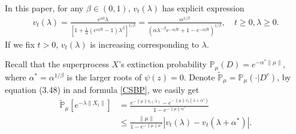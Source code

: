\documentclass[12pt,oneside,english]{amsart}
\theoremstyle{plain}
\theoremstyle{definition}
\numberwithin{equation}{section}
\begin{document}
In this paper, for any $\beta\in (0,1)$, $v_t(\lambda)$ has explicit expression \cite[Example 3.1]{Li2011Measure-valued}
\begin{align*}
    v_t(\lambda)=\frac{e^{\alpha t} \lambda}{[1+\frac{1}{\alpha}(e^{\alpha \beta t}-1)\lambda^{\beta}]^{1/\beta}}=\frac{\alpha^{1/\beta}}{(\alpha\lambda^{-\beta}e^{-\alpha \beta t}+1-e^{-\alpha \beta t})^{1/\beta}},\quad t\geq 0,\lambda\geq 0.
\end{align*}
If we fix $t>0$, $v_t(\lambda)$ is increasing corresponding to $\lambda$.

Recall that the superprocess $X$'s extinction probability $\mathbb{P}_{\mu}(D)=e^{-\alpha^*\|\mu\|}$, where $\alpha^*=\alpha^{1/\beta}$ is the larger roots of $\psi(z)=0$. Denote $\mathbb{\tilde{P}}_{\mu}=\mathbb{P}_{\mu}(\cdot|D^c)$, by equation (3.48) in \cite{Li2011Measure-valued} and formula \eqref{CSBP}, we easily get
\begin{align}
    \mathbb{\tilde{P}}_{\mu}[e^{-\lambda \|X_t\|}]&=\frac{e^{-\|\mu\|v_t(\lambda)}-e^{-\|\mu\|v_t(\lambda+\alpha^*)}}{1-e^{-\|\mu\|\alpha^*}}\nonumber\\
        &\leq \frac{\|\mu\|}{1-e^{-\|\mu\|\alpha^*}}\left|v_t(\lambda)-v_t(\lambda+\alpha^*)\right|. \label{laplaceexpress}
\end{align}
\end{document}
